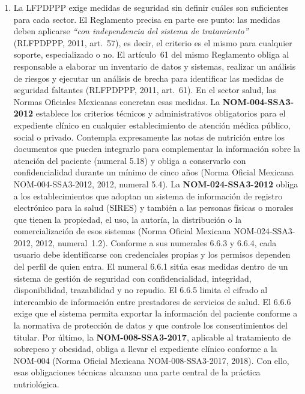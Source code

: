 \documentclass[12pt, a4paper]{article}
\begin{document}
\begin{enumerate}[label=\Roman*.]
  \item La LFPDPPP exige medidas de seguridad sin definir cuáles son
  suficientes para cada sector. El Reglamento precisa en parte ese
  punto: las medidas deben aplicarse \textit{``con independencia del
  sistema de tratamiento''} (RLFPDPPP, 2011, art.~57), es decir, el
  criterio es el mismo para cualquier soporte, especializado o no.
  El artículo~61 del mismo Reglamento obliga al responsable a
  elaborar un inventario de datos y sistemas, realizar un análisis
  de riesgos y ejecutar un análisis de brecha para identificar las
  medidas de seguridad faltantes (RLFPDPPP, 2011, art.~61). En el
  sector salud, las Normas Oficiales Mexicanas concretan esas
  medidas. La \textbf{NOM-004-SSA3-2012} establece los criterios
  técnicos y administrativos obligatorios para el expediente clínico
  en cualquier establecimiento de atención médica público, social o
  privado. Contempla expresamente las notas de nutrición entre los
  documentos que pueden integrarlo para complementar la información
  sobre la atención del paciente (numeral 5.18) y obliga a
  conservarlo con confidencialidad durante un mínimo de cinco años
  (Norma Oficial Mexicana NOM-004-SSA3-2012, 2012, numeral 5.4).
  La \textbf{NOM-024-SSA3-2012} obliga a los establecimientos que
  adoptan un sistema de información de registro electrónico para la
  salud (SIRES) y también a las personas físicas o morales que tienen
  la propiedad, el uso, la autoría, la distribución o la
  comercialización de esos sistemas (Norma Oficial Mexicana
  NOM-024-SSA3-2012, 2012, numeral~1.2). Conforme a sus numerales
  6.6.3 y 6.6.4, cada usuario debe identificarse con credenciales
  propias y los permisos dependen del perfil de quien entra. El numeral
  6.6.1 sitúa esas medidas dentro de un sistema de gestión de seguridad
  con confidencialidad, integridad, disponibilidad, trazabilidad y no
  repudio. El 6.6.5 limita el cifrado al intercambio de información entre
  prestadores de servicios de salud. El 6.6.6 exige que el sistema permita
  exportar la información del paciente conforme a la normativa de
  protección de datos y que controle los consentimientos del titular. Por
  último, la \textbf{NOM-008-SSA3-2017},
  aplicable al tratamiento de sobrepeso y obesidad, obliga a llevar
  el expediente clínico conforme a la NOM-004 (Norma Oficial Mexicana
  NOM-008-SSA3-2017, 2018). Con ello, esas obligaciones técnicas
  alcanzan una parte central de la práctica nutriológica.
 
\end{enumerate}
 
\end{document}
